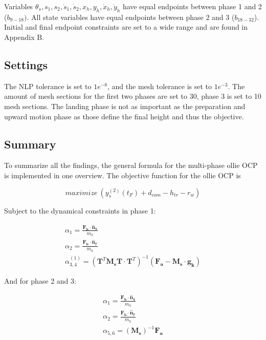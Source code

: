 \documentclass[default,iicol]{sn-jnl}
\begin{document}
Variables $\theta_s, s_1, s_2, \dot s_1, \dot s_2, x_h, y_h, \dot x_h, \dot y_h$ have equal endpoints between phase 1 and 2 ($b_{9-18})$. All state variables have equal endpoints between phase 2 and 3 ($b_{18-32}$). Initial and final endpoint constraints are set to a wide range and are found in Appendix B.

\subsection{Settings}\label{s_settings}
The NLP tolerance is set to $1e^{-8}$, and the mesh tolerance is set to $1e^{-3}$. The amount of mesh sections for the first two phases are set to 30, phase 3 is set to 10 mesh sections. The landing phase is not as important as the preparation and upward motion phase as those define the final height and thus the objective.

\subsection{Summary}\label{s_summary}
To summarize all the findings, the general formula for the multi-phase ollie OCP is implemented in one overview. The objective function for the ollie OCP is 

\begin{equation}
     maximize\ (y_s^{(2)}(t_F) + d_{com} - h_{tr} - r_w)
\end{equation} 

Subject to the dynamical constraints in phase 1:

\begin{equation}
\begin{array}{c}
        \alpha_{1} = \frac{\mathbf{F_h}\cdot \mathbf{\hat n_x}}{m_h}\\
        \alpha_{2} = \frac{\mathbf{F_h}\cdot \mathbf{\hat n_y}}{m_h}\\
        \alpha_{3,4}^{(1)} =   \left(\mathbf{T}^T \mathbf{M_s} \mathbf{T} \cdot  \mathbf{T}^T\right)^{-1} (\mathbf{F_a} - \mathbf{M_s} \cdot \mathbf{g_k})
\end{array}
\end{equation}

And for phase 2 and 3:

\begin{equation}
    \begin{array}{c}
        \alpha_{1} = \frac{\mathbf{F_h}\cdot \mathbf{\hat n_x}}{m_h}\\
        \alpha_{2} = \frac{\mathbf{F_h}\cdot \mathbf{\hat n_y}}{m_h}\\ 
        \alpha_{5,6} = (\mathbf{M_s})^{-1}\mathbf{F_a}
    \end{array}
\end{equation}
\end{document}
